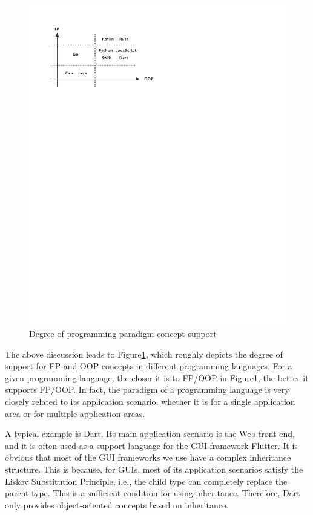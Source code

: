 \begin{figure}[htbp]
    \centerline{\includegraphics[scale=0.8]{figures/paradigm}}
    \caption{Degree of programming paradigm concept support}
    \label{fig:paradigm}
\end{figure}

The above discussion leads to Figure\ref{fig:paradigm}, which roughly depicts the degree of support for FP and OOP concepts in different programming languages.
For a given programming language, the closer it is to FP/OOP in Figure\ref{fig:paradigm}, the better it supports FP/OOP. In fact, the paradigm of a programming language is very closely related to its application scenario, whether it is for a single application area or for multiple application areas.

A typical example is Dart. Its main application scenario is the Web front-end, and it is often used as a support language for the GUI framework Flutter. It is obvious that most of the GUI frameworks we use have a complex inheritance structure. This is because, for GUIs, most of its application scenarios satisfy the Liskov Substitution Principle, i.e., the child type can completely replace the parent type. This is a sufficient condition for using inheritance. Therefore, Dart only provides object-oriented concepts based on inheritance.

